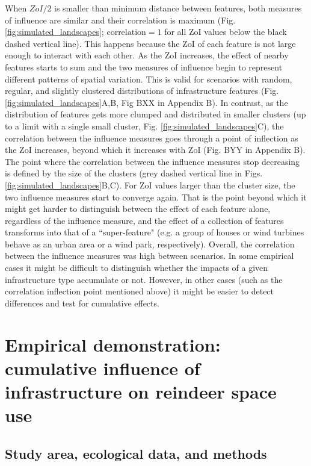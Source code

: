 \documentclass[titlepage]{article}
\begin{document}
When $ZoI/2$ is smaller than minimum distance between features, both measures of influence are similar and their correlation is maximum (Fig. \ref{fig:simulated_landscapes}; $\text{correlation} = 1$ for all ZoI values below the black dashed vertical line). This happens because the ZoI of each feature is not large enough to interact with each other. As the ZoI increases, the effect of nearby features starts to sum and the two measures of influence begin to represent different patterns of spatial variation. This is valid for scenarios with random, regular, and slightly clustered distributions of infrastructure features (Fig. \ref{fig:simulated_landscapes}A,B, Fig BXX in Appendix B). In contrast, as the distribution of features gets more clumped and distributed in smaller clusters (up to a limit with a single small cluster, Fig. \ref{fig:simulated_landscapes}C), the correlation between the influence measures goes through a point of inflection as the ZoI increases, beyond which it increases with ZoI (Fig. BYY in Appendix B). The point where the correlation between the influence measures stop decreasing is defined by the size of the clusters (grey dashed vertical line in Figs. \ref{fig:simulated_landscapes}B,C). For ZoI values larger than the cluster size, the two influence measures start to converge again. That is the point beyond which it might get harder to distinguish between the effect of each feature alone, regardless of the influence measure, and the effect of a collection of features transforms into that of a ``super-feature" (e.g. a group of houses or wind turbines behave as an urban area or a wind park, respectively). 
Overall, the correlation between the influence measures was high between scenarios. In some empirical cases it might be difficult to distinguish whether the impacts of a given infrastructure type accumulate or not. However, in other cases (such as the correlation inflection point mentioned above) it might be easier to detect differences and test for cumulative effects.

\section{Empirical demonstration: cumulative influence of infrastructure on reindeer space use}

\subsection{Study area, ecological data, and methods}
\end{document}
